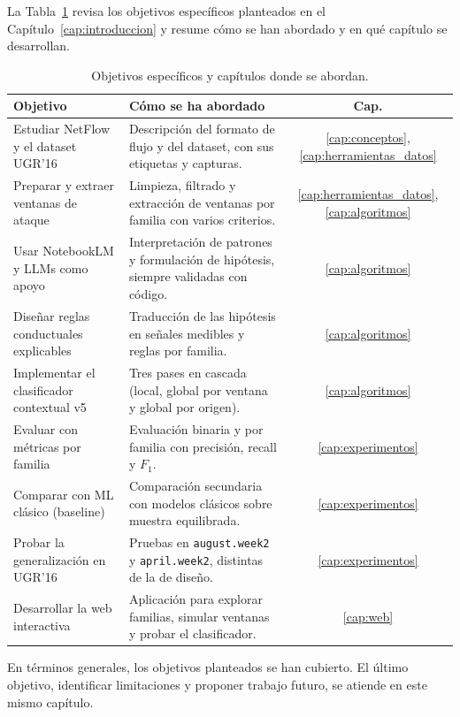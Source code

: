 La Tabla~\ref{tab:cumplimiento} revisa los objetivos específicos planteados en el Capítulo~\ref{cap:introduccion} y resume cómo se han abordado y en qué capítulo se desarrollan.

\begin{table}[ht]
\centering
\small
\begin{tabular}{|p{5.6cm}|p{6.0cm}|c|}
\hline
\textbf{Objetivo} & \textbf{Cómo se ha abordado} & \textbf{Cap.} \\
\hline
Estudiar NetFlow y el dataset UGR'16 & Descripción del formato de flujo y del dataset, con sus etiquetas y capturas. & \ref{cap:conceptos}, \ref{cap:herramientas_datos} \\
\hline
Preparar y extraer ventanas de ataque & Limpieza, filtrado y extracción de ventanas por familia con varios criterios. & \ref{cap:herramientas_datos}, \ref{cap:algoritmos} \\
\hline
Usar NotebookLM y LLMs como apoyo & Interpretación de patrones y formulación de hipótesis, siempre validadas con código. & \ref{cap:algoritmos} \\
\hline
Diseñar reglas conductuales explicables & Traducción de las hipótesis en señales medibles y reglas por familia. & \ref{cap:algoritmos} \\
\hline
Implementar el clasificador contextual v5 & Tres pases en cascada (local, global por ventana y global por origen). & \ref{cap:algoritmos} \\
\hline
Evaluar con métricas por familia & Evaluación binaria y por familia con precisión, recall y $F_1$. & \ref{cap:experimentos} \\
\hline
Comparar con ML clásico (baseline) & Comparación secundaria con modelos clásicos sobre muestra equilibrada. & \ref{cap:experimentos} \\
\hline
Probar la generalización en UGR'16 & Pruebas en \texttt{august.week2} y \texttt{april.week2}, distintas de la de diseño. & \ref{cap:experimentos} \\
\hline
Desarrollar la web interactiva & Aplicación para explorar familias, simular ventanas y probar el clasificador. & \ref{cap:web} \\
\hline
\end{tabular}
\caption{Objetivos específicos y capítulos donde se abordan.}
\label{tab:cumplimiento}
\end{table}

En términos generales, los objetivos planteados se han cubierto. El último objetivo, identificar limitaciones y proponer trabajo futuro, se atiende en este mismo capítulo.


